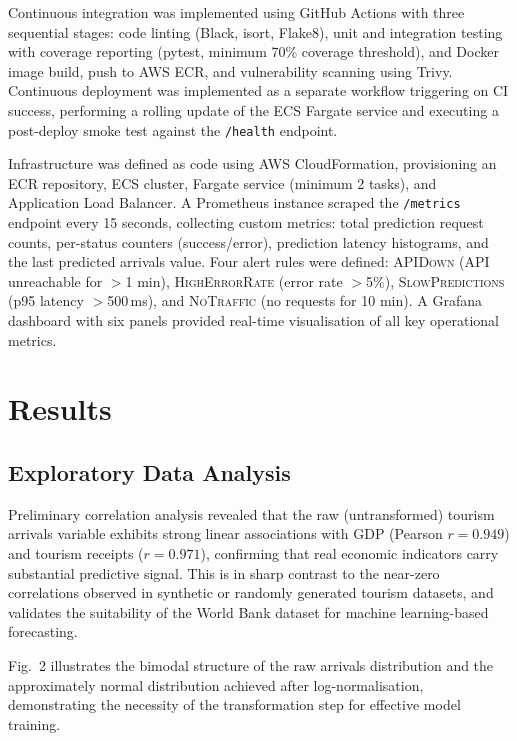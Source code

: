 \documentclass[conference]{IEEEtran}
\begin{document}
Continuous integration was implemented using GitHub Actions
with three sequential stages: code linting (Black, isort,
Flake8), unit and integration testing with coverage
reporting (pytest, minimum 70\% coverage threshold), and
Docker image build, push to AWS ECR, and vulnerability
scanning using Trivy. Continuous deployment was implemented
as a separate workflow triggering on CI success, performing
a rolling update of the ECS Fargate service and executing
a post-deploy smoke test against the \texttt{/health}
endpoint.

Infrastructure was defined as code using AWS CloudFormation,
provisioning an ECR repository, ECS cluster, Fargate
service (minimum 2 tasks), and Application Load Balancer.
A Prometheus instance scraped the \texttt{/metrics}
endpoint every 15 seconds, collecting custom metrics:
total prediction request counts, per-status counters
(success/error), prediction latency histograms, and the
last predicted arrivals value. Four alert rules were
defined: \textsc{APIDown} (API unreachable for $>$1 min),
\textsc{HighErrorRate} (error rate $>$5\%),
\textsc{SlowPredictions} (p95 latency $>$500\,ms), and
\textsc{NoTraffic} (no requests for 10 min). A Grafana
dashboard with six panels provided real-time visualisation
of all key operational metrics.

\section{Results}

\subsection{Exploratory Data Analysis}

Preliminary correlation analysis revealed that the raw
(untransformed) tourism arrivals variable exhibits strong
linear associations with GDP (Pearson $r = 0.949$) and
tourism receipts ($r = 0.971$), confirming that real economic
indicators carry substantial predictive signal. This is in
sharp contrast to the near-zero correlations observed in
synthetic or randomly generated tourism datasets, and
validates the suitability of the World Bank dataset for
machine learning-based forecasting.

Fig.~2 illustrates the bimodal structure of the raw
arrivals distribution and the approximately normal
distribution achieved after log-normalisation, demonstrating
the necessity of the transformation step for effective
model training.
\end{document}
